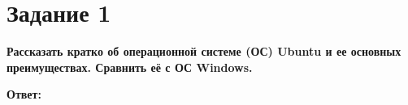 \section{Задание 1}

\textbf{Рассказать кратко об операционной системе (ОС) Ubuntu и ее основных преимуществах. Сравнить её с ОС Windows.}

\textbf{Ответ:}

